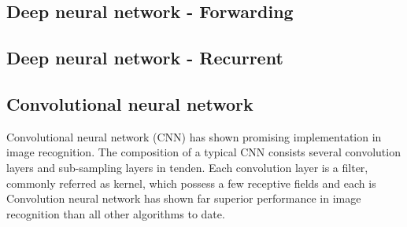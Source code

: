 \subsection{Deep neural network - Forwarding}
\subsection{Deep neural network - Recurrent}
\subsection{Convolutional neural network}
Convolutional neural network (CNN) has shown promising implementation in image recognition. The composition of a typical CNN consists several convolution layers and sub-sampling layers in tenden. Each convolution layer is a filter, commonly referred as kernel, which possess a few receptive fields and each is 
Convolution neural network has shown far superior performance in image recognition than all other algorithms to date.~\cite{Szegedy_2015}